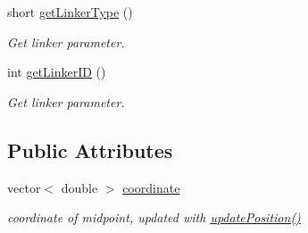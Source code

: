 {\bf }\par
\begin{DoxyCompactItemize}
\item 
short \hyperlink{classLinker_a04dfdd522ce25bffe14e82798fa07c56}{get\+Linker\+Type} ()
\begin{DoxyCompactList}\small\item\em Get linker parameter. \end{DoxyCompactList}\item 
int \hyperlink{classLinker_aaf5fde2540563301384e0404c16b7793}{get\+Linker\+I\+D} ()
\begin{DoxyCompactList}\small\item\em Get linker parameter. \end{DoxyCompactList}\end{DoxyCompactItemize}

\subsection*{Public Attributes}
\begin{DoxyCompactItemize}
\item 
vector$<$ double $>$ \hyperlink{classLinker_a224aa9b2a6f8f565aef4deae0fe299ce}{coordinate}
\begin{DoxyCompactList}\small\item\em coordinate of midpoint, updated with \hyperlink{classLinker_aa268869b1ed75f38973aafd1362a5c42}{update\+Position()} \end{DoxyCompactList}\end{DoxyCompactItemize}
